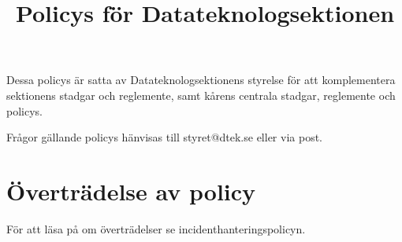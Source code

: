 \documentclass{dtek}
\title{Policys för Datateknologsektionen}
\begin{document}
\maketitle
Dessa policys är satta av Datateknologsektionens styrelse för att komplementera sektionens stadgar och reglemente, samt kårens centrala stadgar, reglemente och policys.

Frågor gällande policys hänvisas till styret@dtek.se eller via post.

\tableofcontents

\newpage

\newpage

\newpage

\newpage

\newpage

\newpage

\newpage

\section{Överträdelse av policy}
För att läsa på om överträdelser se incidenthanteringspolicyn.

\end{document}
